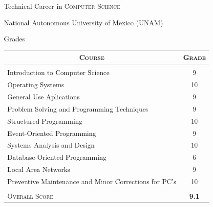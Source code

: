 \documentclass[a4paper,10pt]{article} %
\begin{document}
\par{\centering\LARGE \hypertarget{grdstechcarr}{Technical Career in \textsc{Computer Science}}\par}\par{\centering\Large National Autonomous University of Mexico (UNAM)\par}\large{\centering Grades\par}\small
\bigskip
\bigskip
\bigskip
\begin{center}
	\begin{tabular}{lc}
		\multicolumn{1}{c}{\textsc{Course}} & \textsc{Grade}\\ \hline \\
		Introduction to Computer Science & 9 \\ 
		Operating Systems & 10 \\
		General Use Aplications & 9 \\
		Problem Solving and Programming Techniques & 9 \\
		Structured Programming & 10 \\
		Event-Oriented Programming & 9 \\
		Systems Analysis and Design & 10 \\
		Database-Oriented Programming & 6 \\
		Local Area Networks & 9 \\
		Preventive Maintenance and Minor Corrections for PC's & 10 \\ \\

		\textsc{Overall Score}&\textbf{9.1}
	\end{tabular}
\end{center}

\end{document}
